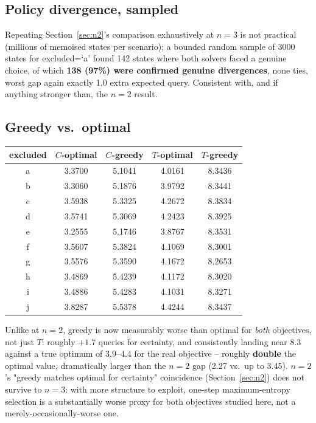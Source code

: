 \documentclass[11pt]{article}
\begin{document}
\subsection{Policy divergence, sampled}

Repeating Section~\ref{sec:n2}'s comparison exhaustively at $n=3$ is not
practical (millions of memoised states per scenario); a bounded random
sample of 3000 states for excluded=`a' found 142 states where both
solvers faced a genuine choice, of which \textbf{138 (97\%) were
confirmed genuine divergences}, none ties, worst gap again exactly 1.0
extra expected query. Consistent with, and if anything stronger than, the
$n=2$ result.

\subsection{Greedy vs.\ optimal}

\begin{center}
\begin{tabular}{ccccc}
\toprule
excluded & $C$-optimal & $C$-greedy & $T$-optimal & $T$-greedy \\
\midrule
a & 3.3700 & 5.1041 & 4.0161 & 8.3436 \\
b & 3.3060 & 5.1876 & 3.9792 & 8.3441 \\
c & 3.5938 & 5.3325 & 4.2672 & 8.3834 \\
d & 3.5741 & 5.3069 & 4.2423 & 8.3925 \\
e & 3.2555 & 5.1746 & 3.8767 & 8.3531 \\
f & 3.5607 & 5.3824 & 4.1069 & 8.3001 \\
g & 3.5576 & 5.3590 & 4.1672 & 8.2653 \\
h & 3.4869 & 5.4239 & 4.1172 & 8.3020 \\
i & 3.4886 & 5.4283 & 4.1031 & 8.3271 \\
j & 3.8287 & 5.5378 & 4.4244 & 8.3437 \\
\bottomrule
\end{tabular}
\end{center}

Unlike at $n=2$, greedy is now measurably worse than optimal for
\emph{both} objectives, not just $T$: roughly $+1.7$ queries for
certainty, and consistently landing near $8.3$ against a true optimum of
$3.9$--$4.4$ for the real objective -- roughly \textbf{double} the
optimal value, dramatically larger than the $n=2$ gap (2.27 vs.\ up to
3.45). $n=2$'s "greedy matches optimal for certainty" coincidence
(Section~\ref{sec:n2}) does not survive to $n=3$: with more structure to
exploit, one-step maximum-entropy selection is a substantially worse
proxy for both objectives studied here, not a merely-occasionally-worse
one.
\end{document}
